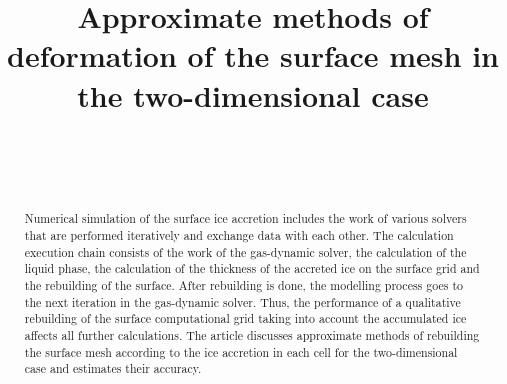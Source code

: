\documentclass[
11pt,%
tightenlines,%
twoside,%
onecolumn,%
nofloats,%
nobibnotes,%
nofootinbib,%
superscriptaddress,%
noshowpacs,%
centertags]%
{revtex4}
\begin{document}

\title{Approximate methods of deformation of the surface mesh in the two-dimensional case}

\author{~}
 

\author{~}
 



\begin{abstract}
Numerical simulation of the surface ice accretion includes the work of various solvers that are performed iteratively and exchange data with each other.
The calculation execution chain consists of the work of the gas-dynamic solver, the calculation of the liquid phase, the calculation of the thickness of the accreted ice on the surface grid and the rebuilding of the surface.
After rebuilding is done, the modelling process goes to the next iteration in the gas-dynamic solver.
Thus, the performance of a qualitative rebuilding of the surface computational grid taking into account the accumulated ice affects all further calculations.
The article discusses approximate methods of rebuilding the surface mesh according to the ice accretion in each cell for the two-dimensional case and estimates their accuracy.
\end{abstract}

\end{document}
